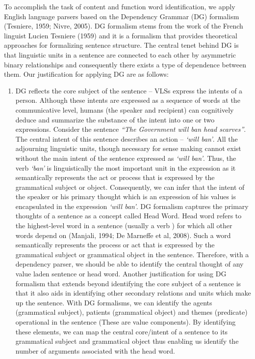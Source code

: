 To accomplish the task of content and function word identification, we apply English language parsers based on the Dependency Grammar (DG) formalism (Tesniere, 1959; Nivre, 2005). DG formalism stems from the work of the French linguist Lucien Tesniere (1959) and it is a formalism that provides theoretical approaches for formalizing sentence structure. The central tenet behind DG is that linguistic units in a sentence are connected to each other by asymmetric binary relationships and consequently there exists a type of dependence between them. Our justification for applying DG are as follows:
\begin{enumerate}
\item
DG reflects the core subject of the sentence -- VLSs express the intents of a person. Although these intents are expressed as a sequence of words at the communicative level, humans (the speaker and recipient) can cognitively deduce and summarize the substance of the intent into one or two expressions. Consider the sentence \textit{``The Government will ban head scarves''}. The central intent of this sentence describes an action – \textit{`will ban'}. All the adjourning linguistic units, though necessary for sense making cannot exist without the main intent of the sentence expressed as \textit{`will ban'}. Thus, the verb \textit{`ban'} is linguistically the most important unit in the expression as it semantically represents the act or process that is expressed by the grammatical subject or object. Consequently, we can infer that the intent of the speaker or his primary thought which is an expression of his values is encapsulated in the expression \textit{`will ban'}. 
DG formalism captures the primary thoughts of a sentence as a concept called Head Word. Head word refers to the highest-level word in a sentence (usually a verb ) for which all other words depend on (Manjali, 1994; De Marneffe et al, 2008). Such a word semantically represents the process or act that is expressed by the grammatical subject or grammatical object in the sentence. Therefore, with a dependency parser, we should be able to identify the central thought of any value laden sentence or head word. Another justification for using DG formalism that extends beyond identifying the core subject of a sentence is that it also aids in identifying other secondary relations and units which make up the sentence. With DG formalisms, we can identify the agents (grammatical subject), patients (grammatical object) and themes (predicate) operational in the sentence (These are value components).  By identifying these elements, we can map the central core/intent of a sentence to its grammatical subject and grammatical object  thus enabling us identify the number of arguments associated with the head word.

\end{enumerate}

